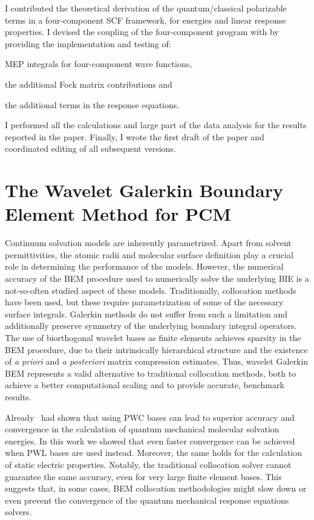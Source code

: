 I contributed the theoretical derivation of the quantum/classical polarizable
terms in a four-component \acs{SCF} framework, for energies and linear response
properties. I devised the coupling of the four-component program \DIRAC with
\pcmsolver by providing the implementation and testing of:
\begin{enumerate*}[label={\alph*)},font={\color{PMS1797}}]
  \item \acs{MEP} integrals for four-component wave functions,
  \item the additional Fock matrix contributions and
  \item the additional terms in the response equations.
\end{enumerate*}
I performed all the calculations and large part of the data analysis
for the results reported in the paper.
Finally, I wrote the first draft of the paper and coordinated editing of
all subsequent versions.

\section{The Wavelet Galerkin Boundary Element Method for PCM}\label{sec:wemlin}

Continuum solvation models are inherently parametrized. Apart from solvent permittivities,
the atomic radii and molecular surface definition play a crucial role
in determining the performance of the models.
However, the numerical accuracy of the \acs{BEM} procedure used to numerically solve the
underlying \acs{BIE} is a not-so-often studied aspect of these models.
Traditionally, collocation methods have been used, but these require parametrization of some of the necessary surface integrals.
Galerkin methods do not suffer from such a limitation and additionally preserve symmetry of the underlying
boundary integral operators.
The use of biorthogonal wavelet bases as finite elements achieves sparsity in
the \acs{BEM} procedure, due to their intrinsically hierarchical structure and
the existence of \emph{a priori} and \emph{a posteriori} matrix compression
estimates.
Thus, wavelet Galerkin \acs{BEM} represents a valid alternative to traditional
collocation methods, both to achieve a better computational scaling and to
provide accurate, benchmark results.\autocite{Harbrecht2004-uo,
Harbrecht2006-ug, Dahmen2006-pj}

Already~\citeauthor{Weijo2010-hy} had shown that using \ac{PWC} bases can lead
to superior accuracy and convergence in the calculation of quantum mechanical
molecular solvation energies.
In this work we showed that even faster convergence can be achieved when
\ac{PWL} bases are used instead.
Moreover, the same holds for the calculation of static electric properties.
Notably, the traditional collocation solver cannot guarantee the same accuracy,
even for very large finite element bases. This suggests that, in some cases,
\acs{BEM} collocation methodologies might slow down or even prevent the
convergence of the quantum mechanical response equations solvers.


